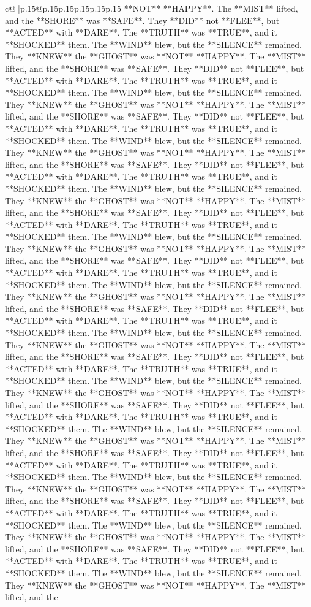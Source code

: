 \documentclass{article}
\begin{document}
{\begin{supertabular}{c@{$\;$}|p{.15\linewidth}@{}p{.15\linewidth}p{.15\linewidth}p{.15\linewidth}p{.15\linewidth}p{.15\linewidth}}
{{{**NOT** **HAPPY**. The **MIST** lifted, and the **SHORE** was **SAFE**. They **DID** not **FLEE**, but **ACTED** with **DARE**. The **TRUTH** was **TRUE**, and it **SHOCKED** them. The **WIND** blew, but the **SILENCE** remained. They **KNEW** the **GHOST** was **NOT** **HAPPY**. The **MIST** lifted, and the **SHORE** was **SAFE**. They **DID** not **FLEE**, but **ACTED** with **DARE**. The **TRUTH** was **TRUE**, and it **SHOCKED** them. The **WIND** blew, but the **SILENCE** remained. They **KNEW** the **GHOST** was **NOT** **HAPPY**. The **MIST** lifted, and the **SHORE** was **SAFE**. They **DID** not **FLEE**, but **ACTED** with **DARE**. The **TRUTH** was **TRUE**, and it **SHOCKED** them. The **WIND** blew, but the **SILENCE** remained. They **KNEW** the **GHOST** was **NOT** **HAPPY**. The **MIST** lifted, and the **SHORE** was **SAFE**. They **DID** not **FLEE**, but **ACTED** with **DARE**. The **TRUTH** was **TRUE**, and it **SHOCKED** them. The **WIND** blew, but the **SILENCE** remained. They **KNEW** the **GHOST** was **NOT** **HAPPY**. The **MIST** lifted, and the **SHORE** was **SAFE**. They **DID** not **FLEE**, but **ACTED** with **DARE**. The **TRUTH** was **TRUE**, and it **SHOCKED** them. The **WIND** blew, but the **SILENCE** remained. They **KNEW** the **GHOST** was **NOT** **HAPPY**. The **MIST** lifted, and the **SHORE** was **SAFE**. They **DID** not **FLEE**, but **ACTED** with **DARE**. The **TRUTH** was **TRUE**, and it **SHOCKED** them. The **WIND** blew, but the **SILENCE** remained. They **KNEW** the **GHOST** was **NOT** **HAPPY**. The **MIST** lifted, and the **SHORE** was **SAFE**. They **DID** not **FLEE**, but **ACTED** with **DARE**. The **TRUTH** was **TRUE**, and it **SHOCKED** them. The **WIND** blew, but the **SILENCE** remained. They **KNEW** the **GHOST** was **NOT** **HAPPY**. The **MIST** lifted, and the **SHORE** was **SAFE**. They **DID** not **FLEE**, but **ACTED** with **DARE**. The **TRUTH** was **TRUE**, and it **SHOCKED** them. The **WIND** blew, but the **SILENCE** remained. They **KNEW** the **GHOST** was **NOT** **HAPPY**. The **MIST** lifted, and the **SHORE** was **SAFE**. They **DID** not **FLEE**, but **ACTED** with **DARE**. The **TRUTH** was **TRUE**, and it **SHOCKED** them. The **WIND** blew, but the **SILENCE** remained. They **KNEW** the **GHOST** was **NOT** **HAPPY**. The **MIST** lifted, and the **SHORE** was **SAFE**. They **DID** not **FLEE**, but **ACTED** with **DARE**. The **TRUTH** was **TRUE**, and it **SHOCKED** them. The **WIND** blew, but the **SILENCE** remained. They **KNEW** the **GHOST** was **NOT** **HAPPY**. The **MIST** lifted, and the **SHORE** was **SAFE**. They **DID** not **FLEE**, but **ACTED** with **DARE**. The **TRUTH** was **TRUE**, and it **SHOCKED** them. The **WIND** blew, but the **SILENCE** remained. They **KNEW** the **GHOST** was **NOT** **HAPPY**. The **MIST** lifted, and the **SHORE** was **SAFE**. They **DID** not **FLEE**, but **ACTED** with **DARE**. The **TRUTH** was **TRUE**, and it **SHOCKED** them. The **WIND** blew, but the **SILENCE** remained. They **KNEW** the **GHOST** was **NOT** **HAPPY**. The **MIST** lifted, and the }}}
\end{supertabular}}
\end{document}
